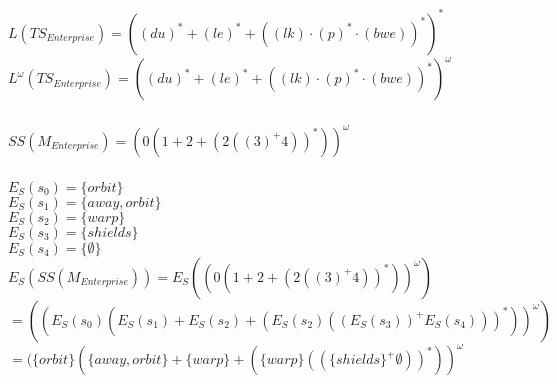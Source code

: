 \documentclass[a4paper,12pt]{scrartcl}
\title{\blatt}
\date{Gruppe 06}
\author{Sabrina Buczko 6663234, Julian Deinert 6535880, Rafael Heid 6704828}
\begin{document}
\maketitle
\newpage
\setcounter{section}{3}
\section{}
\setcounter{subsection}{2}
\subsection{}
\subsubsection{}
$L(TS_{Enterprise})= ((du)^*+(le)^*+((lk)\cdot (p)^*\cdot (bwe))^*)^*$\\
$L^\omega(TS_{Enterprise})=((du)^*+(le)^*+((lk)\cdot (p)^*\cdot (bwe))^*)^\omega$
\subsubsection{}
$SS(M_{Enterprise})=(0(1 + 2 + (2((3)^+ 4))^*))^\omega$\\

\subsubsection{}
$E_S(s_0)=\{orbit\}$\\
$E_S(s_1)=\{away, orbit\}$\\
$E_S(s_2)=\{warp\}$\\
$E_S(s_3)=\{shields\}$\\
$E_S(s_4)=\{\emptyset\}$\\
$E_S(SS(M_{Enterprise}))=E_S((0(1 + 2 + (2((3)^+ 4))^*))^\omega)$\\
$= ((E_S(s_0)(E_S(s_1) + E_S(s_2) + (E_S(s_2)((E_S(s_3))^+ E_S(s_4)))^*))^\omega)$\\
$= (\{orbit\}(\{away,orbit\} + \{warp\} + (\{warp\}((\{shields\}^+ \emptyset))^*))^\omega$\\
\subsubsection{}

\subsubsection{}
\end{document}
